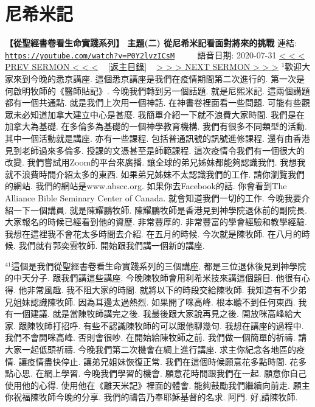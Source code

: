 \documentclass{book}
\begin{document}
\section{尼希米記}
\label{sec:P0Y2lvzICsM}
\textbf{【從聖經書卷看生命實踐系列】 主題(二) 從尼希米記看面對將來的挑戰}
\newline
\newline
連結: \href{https://youtube.com/watch?v=P0Y2lvzICsM}{\texttt{https://youtube.com/watch?v=P0Y2lvzICsM}} ~~~~ 語音日期: 2020-07-31
\newline
\newline
\hyperref[sec:fFkCm0QGBPw]{\small{< < < PREV SERMON < < <}}
~
\hyperref[sec:index]{\small{[返主目錄]}}
~
\hyperref[sec:XLKUZGl9ItY]{\small{> > > NEXT SERMON > > >}}
\newline
\newline
$^{1}$歡迎大家來到今晚的悉京講座.
這個悉京講座是我們在疫情期間第二次進行的.
第一次是何啟明牧師的《醫師貼記》.
今晚我們轉到另一個話題.
就是尼熙米記.
這兩個講題都有一個共通點.
就是我們上次用一個神話.
在神書卷裡面看一些問題.
可能有些觀眾未必知道加拿大建立中心是甚麼.
我簡單介紹一下就不浪費大家時間.
我們是在加拿大為基礎.
在多倫多為基礎的一個神學教育機構.
我們有很多不同類型的活動.
其中一個活動就是講座.
亦有一些課程.
包括普通訊號的訊號進修課程.
還有由香港見到老師過來多倫多.
授課的文憑甚至是師範課程.
這次疫情令我們有一個很大的改變.
我們嘗試用Zoom的平台來廣播.
讓全球的弟兄姊妹都能夠認識我們.
我想我就不浪費時間介紹太多的東西.
如果弟兄姊妹不太認識我們的工作.
請你瀏覽我們的網站.
我們的網站是www.abscc.org.
如果你去Facebook的話.
你會看到The Alliance Bible Seminary Center of Canada.
就會知道我們一切的工作.
今晚我要介紹一下一個講員.
就是陳耀鵬牧師.
陳耀鵬牧師是香港見到神學院退休前的副院長.
大家報名的時候已經看到他的資歷.
非常豐厚的.
非常豐富的學會經驗和教學經驗.
我想在這裡我不會花太多時間去介紹.
在五月的時候.
今次就是陳牧師.
在八月的時候.
我們就有郭奕雲牧師.
開始跟我們講一個新的講座.

$^{41}$這個是我們從聖經書卷看生命實踐系列的三個講座.
都是三位退休後見到神學院的中天分子.
跟我們講這些講座.
今晚陳牧師會用利希米技來講這個題目.
他很有心得.
他非常風趣.
我不阻大家的時間.
就將以下的時段交給陳牧師.
我知道有不少弟兄姐妹認識陳牧師.
因為耳邊太過熱烈.
如果開了咪高峰.
根本聽不到任何東西.
我有一個建議.
就是當陳牧師講完之後.
我最後跟大家說再見之後.
開放咪高峰給大家.
跟陳牧師打招呼.
有些不認識陳牧師的可以跟他聊幾句.
我想在講座的過程中.
我們不會開咪高峰.
否則會很吵.
在開始給陳牧師之前.
我們做一個簡單的祈禱.
請大家一起低頭祈禱.
今晚我們第二次機會在網上進行講座.
求主你紀念各地區的疫情.
讓疫情盡快停止.
讓弟兄姐妹恢復正常.
我們在這個時候願意花多點時間.
花多點心思.
在網上學習.
今晚我們學習的機會.
願意花時間跟我們在一起.
願意你自己使用他的心得.
使用他在《離天米記》裡面的體會.
能夠鼓勵我們繼續向前走.
願主你祝福陳牧師今晚的分享.
我們的禱告乃奉耶穌基督的名求.
阿門.
好,請陳牧師.
\end{document}
